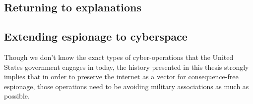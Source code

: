 \documentclass{memoir}
\begin{document}

\subsection{Returning to explanations}



\subsection{Extending espionage to cyberspace}
Though we don't know the exact types of cyber-operations that the United States government engages in today, the history presented in this thesis strongly implies that in order to preserve the internet as a vector for consequence-free espionage, those operations need to be avoiding military associations as much as possible.
\end{document}
